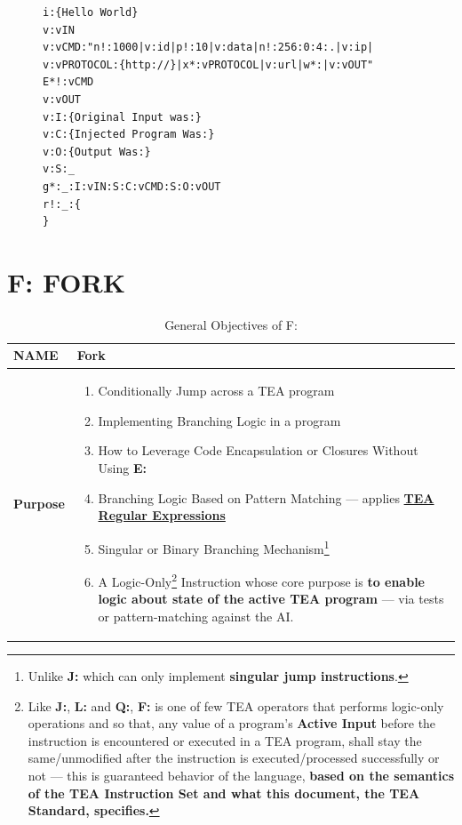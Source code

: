 \documentclass[a4paper, 18pt]{book} %
\begin{document}
 \begin{figure}[H]
 \Large
  \begin{tcolorbox}[teaterminalstyle, title=TEA Program: TEA VIRUS Example]
  \begin{lstlisting}[language=TEA]
i:{Hello World}
v:vIN
v:vCMD:"n!:1000|v:id|p!:10|v:data|n!:256:0:4:.|v:ip|
v:vPROTOCOL:{http://}|x*:vPROTOCOL|v:url|w*:|v:vOUT"
E*!:vCMD
v:vOUT
v:I:{Original Input was:}
v:C:{Injected Program Was:}
v:O:{Output Was:}
v:S:_
g*:_:I:vIN:S:C:vCMD:S:O:vOUT
r!:_:{
}
   \end{lstlisting}
  \end{tcolorbox}
  \label{FIGE2}
\end{figure}




\chapter{F: FORK}
\label{CHAPF}


\begin{table}[H]
  \centering
  \LARGE
	\begin{tabular}[t]{|p{}|p{}}
 
	\textbf{NAME} & Fork\\
	\hline
	\textbf{Purpose} & \begin{enumerate}
	\item Conditionally Jump across a TEA program
	\item Implementing Branching Logic in a program
	\item How to Leverage Code Encapsulation or Closures Without Using \textbf{E:}
	\item Branching Logic Based on Pattern Matching --- applies \textbf{\hyperref[SECREGEXP]{TEA Regular Expressions}}
	\item Singular or Binary Branching Mechanism\footnote{Unlike \textbf{J:} which can only implement \textbf{singular jump instructions}.}
	\item A Logic-Only\footnote{Like \textbf{J:}, \textbf{L:} and \textbf{Q:}, \textbf{F:} is one of few TEA operators that performs logic-only operations and so that, any value of a program's \textbf{Active Input} before the instruction is encountered or executed in a TEA program, shall stay the same/unmodified after the instruction is executed/processed successfully or not --- this is guaranteed behavior of the language, \textbf{based on the semantics of the TEA Instruction Set and what this document, the TEA Standard, specifies.}} Instruction whose core purpose is \textbf{to enable logic about state of the active TEA program} --- via tests or pattern-matching against the AI.
	\end{enumerate}\\
	\hline
	              
\end{tabular}
\caption{General Objectives of F:}
  \label{TABTAZF}
\end{table}
\end{document}
